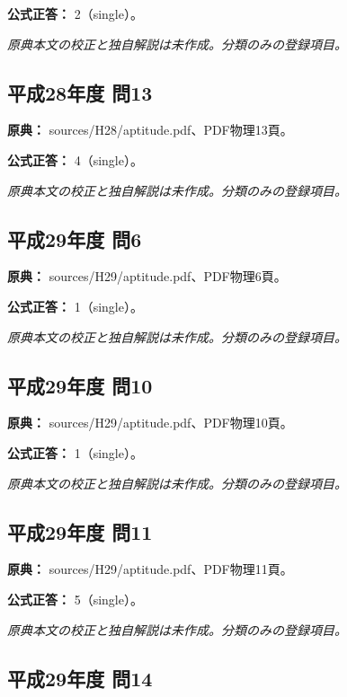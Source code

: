 \textbf{公式正答：} 2（single）。

\par\textit{原典本文の校正と独自解説は未作成。分類のみの登録項目。}

\subsection{平成28年度 問13}
\label{q:h28-reg-apt-13}

\noindent\textbf{原典：} sources/H28/aptitude.pdf、PDF物理13頁。

\textbf{公式正答：} 4（single）。

\par\textit{原典本文の校正と独自解説は未作成。分類のみの登録項目。}

\subsection{平成29年度 問6}
\label{q:h29-reg-apt-06}

\noindent\textbf{原典：} sources/H29/aptitude.pdf、PDF物理6頁。

\textbf{公式正答：} 1（single）。

\par\textit{原典本文の校正と独自解説は未作成。分類のみの登録項目。}

\subsection{平成29年度 問10}
\label{q:h29-reg-apt-10}

\noindent\textbf{原典：} sources/H29/aptitude.pdf、PDF物理10頁。

\textbf{公式正答：} 1（single）。

\par\textit{原典本文の校正と独自解説は未作成。分類のみの登録項目。}

\subsection{平成29年度 問11}
\label{q:h29-reg-apt-11}

\noindent\textbf{原典：} sources/H29/aptitude.pdf、PDF物理11頁。

\textbf{公式正答：} 5（single）。

\par\textit{原典本文の校正と独自解説は未作成。分類のみの登録項目。}

\subsection{平成29年度 問14}
\label{q:h29-reg-apt-14}

